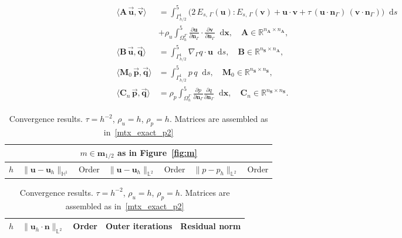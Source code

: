 \documentclass[12pt]{article}
\newcommand{\vect}[1]{\boldsymbol{\mathbf{#1}}}
\newcommand*\diff{\mathop{}\!\mathrm{d}}
\newcommand{\HOne}{{\mathbb H^1}}
\newcommand{\LTwo}{{\mathbb L^2}}
\begin{document}
\begin{align}\begin{split}\label{mtx_exact_p2}
	\langle \vect A\,\vec{\vect u}, \vec{\vect v} \rangle &= 
		\int^5_{\Gamma_{h/2}^1} \big( 2\,E_{s,\,\Gamma}(\vect u) : E_{s,\,\Gamma}(\vect v) + \vect u\cdot\vect v + \tau\,(\vect u\cdot\vect n_{\Gamma})\,(\vect v\cdot\vect n_{\Gamma}) \big) \diff{s} \\
	&
		+ \rho_u \int^5_{\Omega_h^{\Gamma}} \frac{\partial \vect u}{\partial\vect n_{\Gamma}}\cdot\frac{\partial \vect v}{\partial\vect n_{\Gamma}} \diff{\vect x}, \quad \vect A \in \mathbb R^{n_{\vect A} \times n_{\vect A}},\\
	\langle \vect B\,\vec{\vect u}, \vec{\vect q} \rangle &= 
		\int^5_{\Gamma_{h/2}^1} \nabla_{\Gamma} q \cdot \vect u \diff{s}, \quad \vect B \in \mathbb R^{n_{\vect S} \times n_{\vect A}},\\
	\langle \vect M_0\,\vec{\vect p}, \vec{\vect q} \rangle &=
		\int^5_{\Gamma_{h/2}^1} p\,q \diff{s}, \quad \vect M_0 \in \mathbb R^{n_{\vect S} \times n_{\vect S}},\\
	\langle \vect C_n\,\vec{\vect p}, \vec{\vect q} \rangle &=
		\rho_p \int^5_{\Omega^{\Gamma}_h} \frac{\partial p}{\partial\vect n_\Gamma} \frac{\partial q}{\partial\vect n_\Gamma} \diff{\vect x}, \quad \vect C_n \in \mathbb R^{n_{\vect S} \times n_{\vect S}}.		 
\end{split}\end{align}

\begin{table}[H]
	\centering\footnotesize
	\caption{Convergence results. $\tau = h^{-2}$, $\rho_u = h$, $\rho_p = h$. Matrices are assembled as in~\eqref{mtx_exact_p2}}
	\label{tab:p2p1_incons_h^1}
	\begin{subtable}{1.\linewidth}\centering
		\begin{tabular}[1.3]{|c||c|c||c|c||c||c|}
			\hline
			\multicolumn{7}{|c|}{$m \in \vect m_{1/2}$ as in Figure~\ref{fig:m}} \\
			\hline
			$h$ & $\|\vect u - \vect u_h\|_{\HOne}$ & Order & $\|\vect u - \vect u_h\|_{\LTwo}$ & Order & $\|p - p_h\|_{\LTwo}$ & Order \\
			\hline
			
		\end{tabular}
	\end{subtable}
	\vskip 2mm	
	\begin{subtable}{1.\linewidth}\centering
		\begin{tabular}[1.3]{|c||c|c||c||c|}
			\hline
			$h$ & $\| \vect u_h\cdot\vect n \|_{\LTwo}$ & Order & Outer iterations & Residual norm \\
			\hline
			
		\end{tabular}
	\end{subtable}
\end{table}
\end{document}
